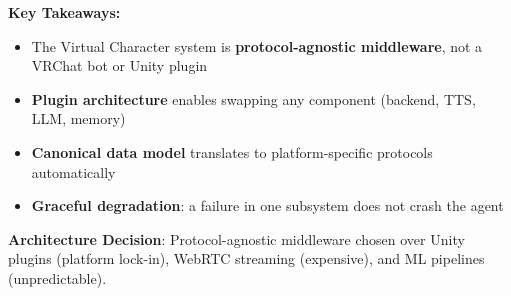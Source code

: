 \documentclass[11pt,letterpaper]{article}
\begin{document}
\begin{tcolorbox}[
  enhanced,
  colback=vcprimary!5,
  colframe=vcprimary!50,
  boxrule=1pt,
  arc=6pt,
  title={\textcolor{white}{\sffamily\bfseries Part I Summary: Architecture Foundations}},
  colbacktitle=vcprimary,
  partsummary
]
\small
\textbf{Key Takeaways:}
\begin{itemize}[nosep, leftmargin=1.5em]
  \item The Virtual Character system is \textbf{protocol-agnostic middleware}, not a VRChat bot or Unity plugin
  \item \textbf{Plugin architecture} enables swapping any component (backend, TTS, LLM, memory)
  \item \textbf{Canonical data model} translates to platform-specific protocols automatically
  \item \textbf{Graceful degradation}: a failure in one subsystem does not crash the agent
\end{itemize}

\vspace{0.3cm}
\textbf{Architecture Decision}: Protocol-agnostic middleware chosen over Unity plugins (platform lock-in), WebRTC streaming (expensive), and ML pipelines (unpredictable).
\end{tcolorbox}
\end{document}
